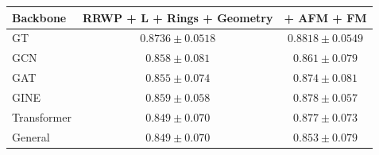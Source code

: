\begin{tabular}{l c c}
\toprule
Backbone & RRWP + L + Rings + Geometry & + AFM + FM \\
\midrule
GT & $0.8736 \pm 0.0518$ & $0.8818 \pm 0.0549$ \\
GCN & $0.858 \pm 0.081$ & $0.861 \pm 0.079$ \\
GAT & $0.855 \pm 0.074$ & $0.874 \pm 0.081$ \\
GINE & $0.859 \pm 0.058$ & $0.878 \pm 0.057$ \\
Transformer & $0.849 \pm 0.070$ & $0.877 \pm 0.073$ \\
General & $0.849 \pm 0.070$ & $0.853 \pm 0.079$ \\
\bottomrule
\end{tabular}
